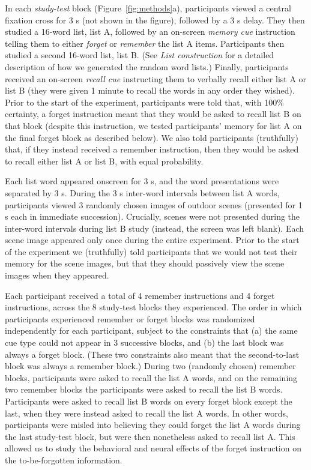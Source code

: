 \documentclass[11pt]{article}
\begin{document}
In each \textit{study-test} block (Figure~\ref{fig:methods}a),
participants viewed a central fixation cross for 3 s (not shown in the
figure), followed by a 3 s delay.  They then studied a 16-word list,
list A, followed by an on-screen \textit{memory cue} instruction
telling them to either \textit{forget} or \textit{remember} the list A
items.  Participants then studied a second 16-word list, list B.  (See
\textit{List construction} for a detailed description of how we
generated the random word lists.)  Finally, participants received an
on-screen \textit{recall cue} instructing them to verbally recall
either list A or list B (they were given 1 minute to recall the words
in any order they wished).  Prior to the start of the experiment,
participants were told that, with 100\% certainty, a forget
instruction meant that they would be asked to recall list B on that
block (despite this instruction, we tested participants' memory for
list A on the final forget block as described below).  We also told
participants (truthfully) that, if they instead received a remember
instruction, then they would be asked to recall either list A or list
B, with equal probability.

Each list word appeared onscreen for 3 s, and the word presentations
were separated by 3 s.  During the 3 s inter-word intervals between
list A words, participants viewed 3 randomly chosen images of outdoor
scenes (presented for 1 s each in immediate succession). Crucially,
scenes were not presented during the inter-word intervals during list
B study (instead, the screen was left blank). Each scene image
appeared only once during the entire experiment.  Prior to the start
of the experiment we (truthfully) told participants that we would not
test their memory for the scene images, but that they should passively
view the scene images when they appeared.

Each participant received a total of 4 remember instructions and 4
forget instructions, across the 8 study-test blocks they experienced.
The order in which participants experienced remember or forget blocks
was randomized independently for each participant, subject to the
constraints that (a) the same cue type could not appear in 3
successive blocks, and (b) the last block was always a forget block.
(These two constraints also meant that the second-to-last block was
always a remember block.)  During two (randomly chosen) remember
blocks, participants were asked to recall the list A words, and on the
remaining two remember blocks the participants were asked to recall
the list B words.  Participants were asked to recall list B words on
every forget block except the last, when they were instead asked to
recall the list A words.  In other words, participants were misled
into believing they could forget the list A words during the last
study-test block, but were then nonetheless asked to recall list A.
This allowed us to study the behavioral and neural effects of the
forget instruction on the to-be-forgotten information.
\end{document}

